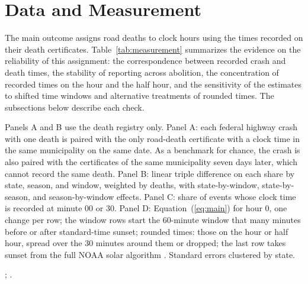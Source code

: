 
\section{Data and Measurement}\label{app:data}

The main outcome assigns road deaths to clock hours using the times recorded on their death certificates. Table~\ref{tab:measurement} summarizes the evidence on the reliability of this assignment: the correspondence between recorded crash and death times, the stability of reporting across abolition, the concentration of recorded times on the hour and the half hour, and the sensitivity of the estimates to shifted time windows and alternative treatments of rounded times. The subsections below describe each check.

\begin{table}[tbp]
  \caption{Measuring the Hour of Death}
  \label{tab:measurement}
  \centering\footnotesize\setlength{\tabcolsep}{5pt}\renewcommand{\arraystretch}{0.82}
  
  \begin{tablenotes}[Notes]
  Panels A and B use the death registry only. Panel A: each federal highway crash with one death is paired with the only road-death certificate with a clock time in the same municipality on the same date. As a benchmark for chance, the crash is also paired with the certificates of the same municipality seven days later, which cannot record the same death. Panel B: linear triple difference on each share by state, season, and window, weighted by deaths, with state-by-window, state-by-season, and season-by-window effects. Panel C: share of events whose clock time is recorded at minute 00 or 30. Panel D: Equation~(\ref{eq:main}) for hour 0, one change per row; the window rows start the 60-minute window that many minutes before or after standard-time sunset; rounded times: those on the hour or half hour, spread over the 30 minutes around them or dropped; the last row takes sunset from the full NOAA solar algorithm \citep{meeus1998astronomical}. Standard errors clustered by state.
  \end{tablenotes}
  \begin{tablenotes}[Sources]
  \citet{datasus2025sim}; \citet{prf2025dados}.
  \end{tablenotes}
\end{table}

